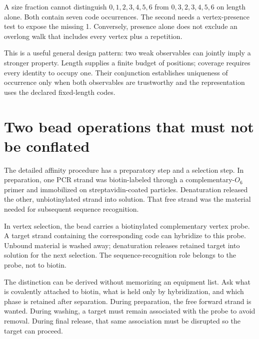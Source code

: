 A size fraction cannot distinguish $0,1,2,3,4,5,6$ from $0,3,2,3,4,5,6$ on length alone. Both contain seven code occurrences. The second needs a vertex-presence test to expose the missing 1. Conversely, presence alone does not exclude an overlong walk that includes every vertex plus a repetition.

This is a useful general design pattern: two weak observables can jointly imply a stronger property. Length supplies a finite budget of positions; coverage requires every identity to occupy one. Their conjunction establishes uniqueness of occurrence only when both observables are trustworthy and the representation uses the declared fixed-length codes.

\section{Two bead operations that must not be conflated}
The detailed affinity procedure has a preparatory step and a selection step. In preparation, one PCR strand was biotin-labeled through a complementary-$O_6$ primer and immobilized on streptavidin-coated particles. Denaturation released the other, unbiotinylated strand into solution. That free strand was the material needed for subsequent sequence recognition.

In vertex selection, the bead carries a biotinylated complementary vertex probe. A target strand containing the corresponding code can hybridize to this probe. Unbound material is washed away; denaturation releases retained target into solution for the next selection. The sequence-recognition role belongs to the probe, not to biotin.\cite{Adleman1994}


The distinction can be derived without memorizing an equipment list. Ask what is covalently attached to biotin, what is held only by hybridization, and which phase is retained after separation. During preparation, the free forward strand is wanted. During washing, a target must remain associated with the probe to avoid removal. During final release, that same association must be disrupted so the target can proceed.

